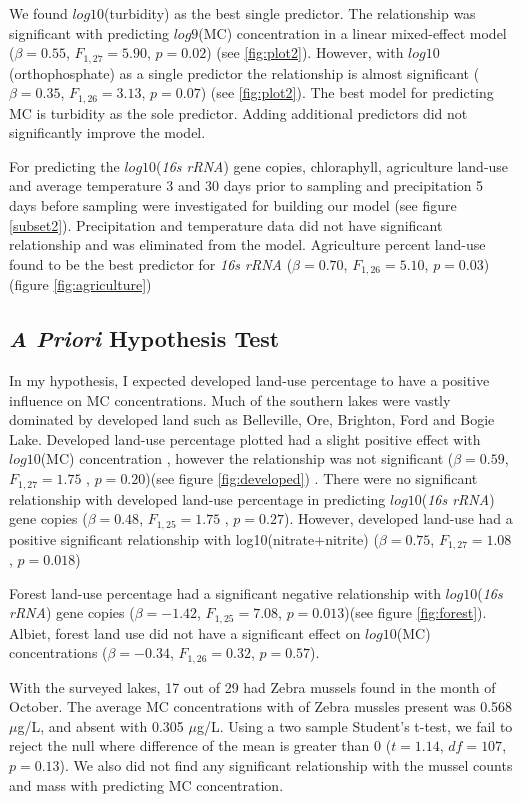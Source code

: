 We found $log10$(turbidity) as the best single predictor. The relationship was significant with predicting $log9$(MC) concentration in a linear mixed-effect model ($\beta=0.55$, $F_{{1,27}}=5.90$, $p=0.02$) (see \ref{fig:plot2}). However, with $log10$(orthophosphate) as a single predictor the relationship is almost significant ($\beta=0.35$, $F_{{1,26}}=3.13$, $p=0.07$) (see \ref{fig:plot2}).  The best model for predicting MC is turbidity as the sole predictor. Adding additional predictors did not significantly improve the model.

For predicting the $log10$(\emph{16s rRNA}) gene copies, chloraphyll, agriculture land-use and average temperature 3 and 30 days prior to sampling and precipitation 5 days before sampling were investigated for building our model (see figure \ref{subset2}). Precipitation and temperature data did not have significant relationship and was eliminated from the model. Agriculture percent land-use found to be the best predictor for \emph{16s rRNA} ($\beta=0.70$, $F_{{1,26}}=5.10$, $p=0.03$)(figure \ref{fig:agriculture})



\subsection{\emph{A Priori} Hypothesis Test}

In my hypothesis, I expected developed land-use percentage to have a positive influence on MC concentrations. Much of the southern lakes were vastly dominated by developed land such as Belleville, Ore, Brighton, Ford and Bogie Lake. 
Developed land-use percentage plotted had a slight positive effect with $log10$(MC) concentration , however the relationship was not significant  ($\beta=0.59$, $F_{{1,27}}=1.75$ , $p=0.20$)(see figure \ref{fig:developed}) . There were no significant relationship with developed land-use percentage in predicting $log10$(\emph{16s rRNA}) gene copies ($\beta=0.48$, $F_{{1,25}}=1.75$ , $p=0.27$). However, developed land-use had a positive significant relationship with log10(nitrate+nitrite) ($\beta=0.75$, $F_{{1,27}}=1.08$, $p=0.018$)

Forest land-use percentage had a significant negative relationship with $log10$(\emph{16s rRNA}) gene copies ($\beta=-1.42$, $F_{{1,25}}=7.08$, $p=0.013$)(see figure \ref{fig:forest}). Albiet, forest land use did not have a significant effect on $log10$(MC) concentrations ($\beta=-0.34$, $F_{{1,26}}=0.32$, $p=0.57$).

With the surveyed lakes, 17 out of 29 had Zebra mussels found in the month of October. The average MC concentrations with  of Zebra mussles present was 0.568 $\mu$g/L, and absent with 0.305 $\mu$g/L. Using a two sample Student's t-test, we fail to reject the null where difference of the mean is greater than 0 ($t=1.14$, $df=107$, $p=0.13$). We also did not find any significant relationship with the mussel counts and mass with predicting MC concentration.



